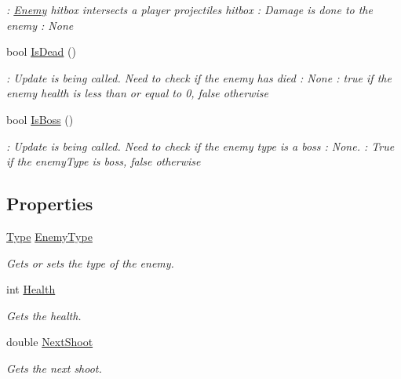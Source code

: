 \begin{DoxyCompactItemize}
\begin{DoxyCompactList}\small\item\em \+: \hyperlink{classXaria_1_1Enemy}{Enemy} hitbox intersects a player projectile\textquotesingle{}s hitbox \+: Damage is done to the enemy \+: None \end{DoxyCompactList}\item 
bool \hyperlink{classXaria_1_1Enemy_ad4a9e26e30c920fafbae59415476f281}{Is\+Dead} ()
\begin{DoxyCompactList}\small\item\em \+: Update is being called. Need to check if the enemy has died \+: None \+: true if the enemy health is less than or equal to 0, false otherwise \end{DoxyCompactList}\item 
bool \hyperlink{classXaria_1_1Enemy_a809f1adcc325a17d07f6cc3cd74e7139}{Is\+Boss} ()
\begin{DoxyCompactList}\small\item\em \+: Update is being called. Need to check if the enemy type is a boss \+: None. \+: True if the enemy\+Type is boss, false otherwise \end{DoxyCompactList}\end{DoxyCompactItemize}
\subsection*{Properties}
\begin{DoxyCompactItemize}
\item 
\hyperlink{classXaria_1_1Enemy_af736652ccf0a3aabacb41bd1afd41234}{Type} \hyperlink{classXaria_1_1Enemy_a5eeea6a504a8f722663fffd8d6f3618a}{Enemy\+Type}
\begin{DoxyCompactList}\small\item\em Gets or sets the type of the enemy. \end{DoxyCompactList}\item 
int \hyperlink{classXaria_1_1Enemy_a074d424a513ab8a574e903f3eda7b9a1}{Health}
\begin{DoxyCompactList}\small\item\em Gets the health. \end{DoxyCompactList}\item 
double \hyperlink{classXaria_1_1Enemy_a29bbc071a0375540281b0f6c2bb36dea}{Next\+Shoot}
\begin{DoxyCompactList}\small\item\em Gets the next shoot. \end{DoxyCompactList}\end{DoxyCompactItemize}


